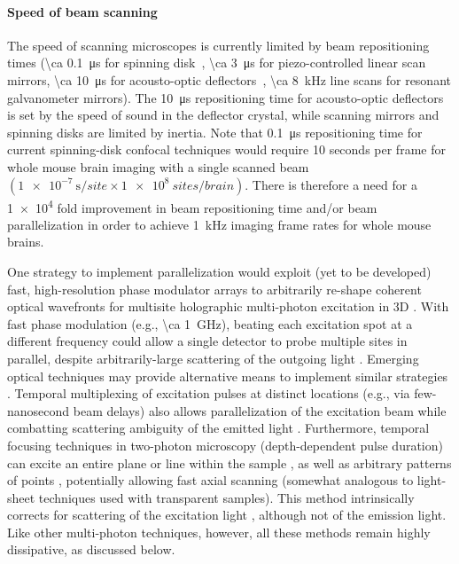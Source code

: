 \paragraph{Speed of beam scanning}
The speed of scanning microscopes is currently limited by beam repositioning times (\SI{\ca 0.1}{\micro\second} for spinning disk~\cite{mahalati13,kang10,flusberg05}, \SI{\ca 3}{\micro\second} for piezo-controlled linear scan mirrors, \SI{\ca 10}{\micro\second} for acousto-optic deflectors~\cite{vucinic07}, \SI{\ca 8}{\kilo\hertz} line scans for resonant galvanometer mirrors). The \SI{10}{\micro\second} repositioning time for acousto-optic deflectors is set by the speed of sound in the deflector crystal, while scanning mirrors and spinning disks are limited by inertia.
Note that \SI{0.1}{\micro\second} repositioning time for current spinning-disk confocal techniques would require 10 seconds per frame for whole mouse brain imaging with a single scanned beam $\left(\SI{1e-7}{\second\per site}\times\SI{1e8}{sites\per brain}\right)$. There is therefore a need for a \num{1e4} fold improvement in beam repositioning time and/or beam parallelization in order to achieve \SI{1}{\kilo\hertz} imaging frame rates for whole mouse brains.

One strategy to implement parallelization would exploit (yet to be developed) fast, high-resolution phase modulator arrays to arbitrarily re-shape coherent optical wavefronts for multisite holographic multi-photon excitation in 3D \cite{alivisatos13, papagiakoumou2010scanless, vaziri2012reshaping}. With fast phase modulation (e.g., \SI{\ca 1}{\giga\hertz}), beating each excitation spot at a different frequency could allow a single detector to probe multiple sites in parallel, despite arbitrarily-large scattering of the outgoing light \cite{alivisatos13}. Emerging optical techniques may provide alternative means to implement similar strategies \cite{diebold2013digitally}. Temporal multiplexing of excitation pulses at distinct locations (e.g., via few-nanosecond beam delays) also allows parallelization of the excitation beam while combatting scattering ambiguity of the emitted light \cite{cheng2011simultaneous}. Furthermore, temporal focusing techniques in two-photon microscopy (depth-dependent pulse duration) can excite an entire plane or line within the sample \cite{oron2005scanningless, tal2005improved, sela2013ultra, packer2013targeting}, as well as arbitrary patterns of points \cite{papagiakoumou2010scanless}, potentially allowing fast axial scanning (somewhat analogous to light-sheet techniques used with transparent samples). This method intrinsically corrects for scattering of the excitation light \cite{papagiakoumou2013functional}, although not of the emission light. Like other multi-photon techniques, however, all these methods remain highly dissipative, as discussed below.


